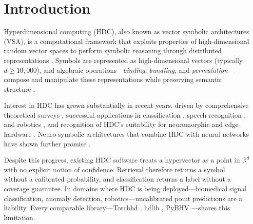 \documentclass[twoside,11pt]{article}
\begin{document}
\section{Introduction}

Hyperdimensional computing (HDC), also known as vector symbolic architectures (VSA), is a computational framework that exploits properties of high-dimensional random vector spaces to perform symbolic reasoning through distributed representations \citep{kanerva2009hyperdimensional, gayler2003vector}. Symbols are represented as high-dimensional vectors (typically $d \geq 10{,}000$), and algebraic operations---\emph{binding}, \emph{bundling}, and \emph{permutation}---compose and manipulate these representations while preserving semantic structure \citep{plate1995holographic, kanerva2010dollar}.

Interest in HDC has grown substantially in recent years, driven by comprehensive theoretical surveys \citep{kleyko2022survey1, kleyko2022survey2}, successful applications in classification \citep{rahimi2016robust}, speech recognition \citep{imani2017voicehd}, and robotics \citep{neubert2019introduction}, and recognition of HDC's suitability for neuromorphic and edge hardware \citep{kleyko2022vector}. Neuro-symbolic architectures that combine HDC with neural networks have shown further promise \citep{hersche2023neuro}.

Despite this progress, existing HDC software treats a hypervector as a point in $\mathbb{R}^d$ with no explicit notion of confidence. Retrieval therefore returns a symbol without a calibrated probability, and classification returns a label without a coverage guarantee. In domains where HDC is being deployed---biomedical signal classification, anomaly detection, robotics---uncalibrated point predictions are a liability. Every comparable library---Torchhd \citep{heddes2023torchhd}, hdlib \citep{cumbo2023hdlib}, PyBHV \citep{vandervorst2023pybhv}---shares this limitation.
\end{document}
